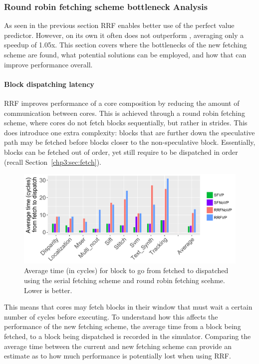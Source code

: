 \subsubsection{Round robin fetching scheme bottleneck Analysis}

As seen in the previous section RRF enables better use of the perfect value predictor. 
However, on its own it often does not outperform \novp{}, averaging only a speedup of 1.05x.
This section covers where the bottlenecks of the new fetching scheme are found, what potential solutions can be employed, and how that can improve performance overall.

\paragraph*{Block dispatching latency}

RRF improves performance of a core composition by reducing the amount of communication between cores.
This is achieved through a round robin fetching scheme, where cores do not fetch blocks sequentially, but rather in strides.
This does introduce one extra complexity: blocks that are further down the speculative path may be fetched before blocks closer to the non-speculative block.
Essentially, blocks can be fetched out of order, yet still require to be dispatched in order (recall Section~\ref{chp3:sec:fetch}).

\begin{figure}[t]
    \centering
    \includegraphics[width=1\textwidth]{chapter3/graphics/avTimeToFetch3.pdf}
    \caption{Average time (in cycles) for block to go from fetched to dispatched using the serial fetching scheme and round robin fetching scehme. Lower is better.}
    \label{fig:av_time}
	\vspace{1em}
\end{figure}

This means that cores may fetch blocks in their window that must wait a certain number of cycles before executing.
To understand how this affects the performance of the new fetching scheme, the average time from a block being fetched, to a block being dispatched is recorded in the simulator.
Comparing the average time between the current and new fetching scheme can provide an estimate as to how much performance is potentially lost when using RRF.

